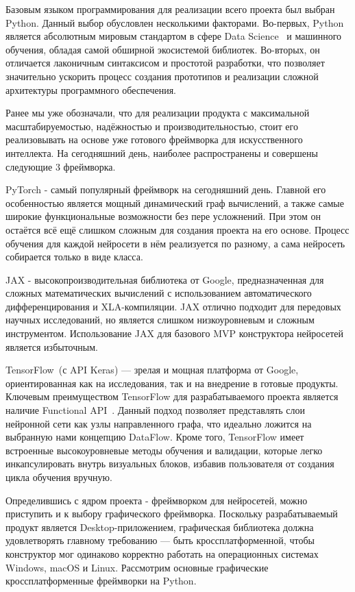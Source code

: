 \documentclass{report}
\begin{document}
Базовым языком программирования для реализации всего проекта был выбран Python. Данный выбор обусловлен несколькими факторами. Во-первых, Python является абсолютным мировым стандартом в сфере Data Science~\cite{bib_python_docs} и машинного обучения, обладая самой обширной экосистемой библиотек. Во-вторых, он отличается лаконичным синтаксисом и простотой разработки, что позволяет значительно ускорить процесс создания прототипов и реализации сложной архитектуры программного обеспечения.

Ранее мы уже обозначали, что для реализации продукта с максимальной масштабируемостью, надёжностью и производительностью, стоит его реализовывать на основе уже готового фреймворка для искусственного интеллекта. На сегодняшний день, наиболее распространены и совершены следующие 3 фреймворка.

\begin{enummarker}
\item PyTorch - самый популярный фреймворк на сегодняшний день. Главной его особенностью является мощный динамический граф вычислений, а также самые широкие функциональные возможности без пере усложнений. При этом он остаётся всё ещё слишком сложным для создания проекта на его основе. Процесс обучения для каждой нейросети в нём реализуется по разному, а сама нейросеть собирается только в виде класса.
\item JAX - высокопроизводительная библиотека от Google, предназначенная для сложных математических вычислений с использованием автоматического дифференцирования и XLA-компиляции. JAX отлично подходит для передовых научных исследований, но является слишком низкоуровневым и сложным инструментом. Использование JAX для базового MVP конструктора нейросетей является избыточным.
\item TensorFlow~(с API Keras) — зрелая и мощная платформа от Google, ориентированная как на исследования, так и на внедрение в готовые продукты. Ключевым преимуществом TensorFlow для разрабатываемого проекта является наличие Functional API~\cite{bib_keras_api}. Данный подход позволяет представлять слои нейронной сети как узлы направленного графа, что идеально ложится на выбранную нами концепцию DataFlow. Кроме того, TensorFlow имеет встроенные высокоуровневые методы обучения и валидации, которые легко инкапсулировать внутрь визуальных блоков, избавив пользователя от создания цикла обучения вручную.
\end{enummarker}

Определившись с ядром проекта - фреймворком для нейросетей, можно приступить и к выбору графического фреймворка. Поскольку разрабатываемый продукт является Desktop-приложением, графическая библиотека должна удовлетворять главному требованию — быть кроссплатформенной, чтобы конструктор мог одинаково корректно работать на операционных системах Windows, macOS и Linux. Рассмотрим основные графические кроссплатформенные фреймворки на Python.
\end{document}
